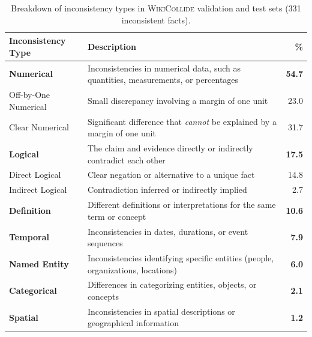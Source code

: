 \documentclass[11pt]{article}
\newcommand{\dataset}[0]{\textsc{WikiCollide}\xspace}
\begin{document}
\begin{table}[ht!]
\centering
\small
\renewcommand{\arraystretch}{1.2}
\begin{tabular}{@{\hspace{0.5em}}lp{}r@{\hspace{0.5em}}}
    \toprule
    
    \textbf{Inconsistency Type} & \textbf{Description} & \textbf{\%} \\
    
    \midrule
    \rowcolor{actionblue!30}
    \textbf{Numerical} & Inconsistencies in numerical data, such as quantities, measurements, or percentages & \textbf{54.7} \\
    \rowcolor{actionblue!10}
    \quad Off-by-One Numerical & Small discrepancy involving a margin of one unit & 23.0 \\
    \rowcolor{actionblue!10}
    \quad Clear Numerical & Significant difference that \emph{cannot} be explained by a margin of one unit & 31.7 \\
    
    \rowcolor{actionblue!30}
    \textbf{Logical} & The claim and evidence directly or indirectly contradict each other & \textbf{17.5} \\
    \rowcolor{actionblue!10}
    \quad Direct Logical & Clear negation or alternative to a unique fact & 14.8 \\
    \rowcolor{actionblue!10}
    \quad Indirect Logical & Contradiction inferred or indirectly implied & 2.7 \\
    \rowcolor{actionblue!30}
    \textbf{Definition} & Different definitions or interpretations for the same term or concept & \textbf{10.6} \\
    \rowcolor{actionblue!30}
    \textbf{Temporal} & Inconsistencies in dates, durations, or event sequences & \textbf{7.9} \\
    \rowcolor{actionblue!30}
    \textbf{Named Entity} & Inconsistencies identifying specific entities (people, organizations, locations) & \textbf{6.0} \\
    \rowcolor{actionblue!30}
    \textbf{Categorical} & Differences in categorizing entities, objects, or concepts & \textbf{2.1} \\
    \rowcolor{actionblue!30}
    \textbf{Spatial} & Inconsistencies in spatial descriptions or geographical information & \textbf{1.2} \\
    \bottomrule
\end{tabular}
\caption{Breakdown of inconsistency types in \dataset validation and test sets (331 inconsistent facts).}
\label{tab:inconsistency_breakdown}
\end{table}
\end{document}
